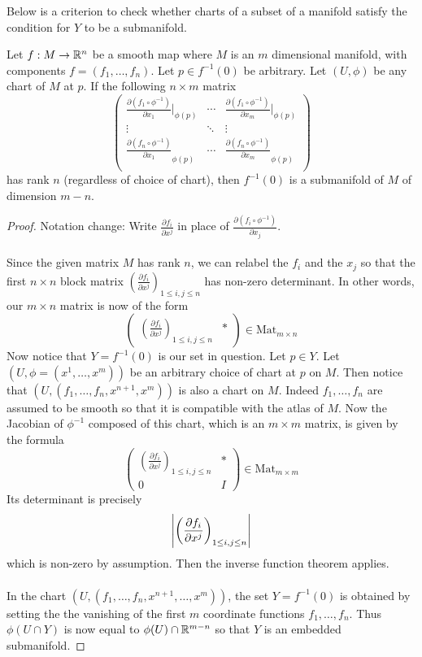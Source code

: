 \documentclass[a4paper]{article}
\begin{document}
Below is a criterion to check whether charts of a subset of a manifold satisfy the condition for $Y$ to be a submanifold. 

\begin{thm}{}{} Let $f:M\to \mathbb{R}^n$ be a smooth map where $M$ is an $m$ dimensional manifold, with components $f=(f_1,\dots,f_n)$. Let $p\in f^{-1}(0)$ be arbitrary. Let $(U,\phi)$ be any chart of $M$ at $p$. If the following $n\times m$ matrix $$\begin{pmatrix}
\frac{\partial(f_1\circ\phi^{-1})}{\partial x_1}|_{\phi(p)} & \cdots & \frac{\partial(f_1\circ\phi^{-1})}{\partial x_m}|_{\phi(p)}\\
\vdots & \ddots & \vdots\\
\frac{\partial(f_n\circ\phi^{-1})}{\partial x_1}_{\phi(p)} & \cdots & \frac{\partial(f_n\circ\phi^{-1})}{\partial x_m}_{\phi(p)}\\
\end{pmatrix}$$
has rank $n$ (regardless of choice of chart), then $f^{-1}(0)$ is a submanifold of $M$ of dimension $m-n$. \tcbline
\begin{proof}
Notation change: Write $\frac{\partial f_i}{\partial x^j}$ in place of $\frac{\partial(f_i\circ\phi^{-1})}{\partial x_j}$. \\~\\
 
Since the given matrix $M$ has rank $n$, we can relabel the $f_i$ and the $x_j$ so that the first $n\times n$ block matrix $\left(\frac{\partial f_i}{\partial x^j}\right)_{1\leq i,j\leq n}$ has non-zero determinant. In other words, our $m\times n$ matrix is now of the form $$\begin{pmatrix}
\left(\frac{\partial f_i}{\partial x^j}\right)_{1\leq i,j\leq n} & \ast
\end{pmatrix}\in\text{Mat}_{m\times n}$$ Now notice that $Y=f^{-1}(0)$ is our set in question. Let $p\in Y$. Let $(U,\phi=(x^1,\dots,x^m))$ be an arbitrary choice of chart at $p$ on $M$. Then notice that $(U,(f_1,\dots,f_n,x^{n+1},x^m))$ is also a chart on $M$. Indeed $f_1,\dots,f_n$ are assumed to be smooth so that it is compatible with the atlas of $M$. Now the Jacobian of $\phi^{-1}$ composed of this chart, which is an $m\times m$ matrix, is given by the formula $$\begin{pmatrix}
\left(\frac{\partial f_i}{\partial x^j}\right)_{1\leq i,j\leq n} & \ast\\
0 & I
\end{pmatrix}\in\text{Mat}_{m\times m}$$ Its determinant is precisely $$\abs{\left(\frac{\partial f_i}{\partial x^j}\right)_{1\leq i,j\leq n}}$$ which is non-zero by assumption. Then the inverse function theorem applies. \\~\\

In the chart $(U,(f_1,\dots,f_n,x^{n+1},\dots,x^m))$, the set $Y=f^{-1}(0)$ is obtained by setting the the vanishing of the first $m$ coordinate functions $f_1,\dots,f_n$. Thus $\phi(U\cap Y)$ is now equal to $\phi(U)\cap\mathbb{R}^{m-n}$ so that $Y$ is an embedded submanifold. 
\end{proof}
\end{thm}
\end{document}
